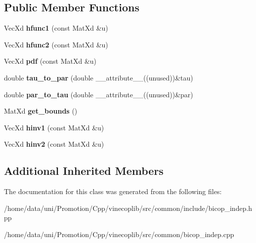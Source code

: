 \subsection*{Public Member Functions}
\begin{DoxyCompactItemize}
\item 
\hypertarget{class_indep_bicop_aced6c870ff8aeacf8332e65cbed82aed}{Vec\+Xd {\bfseries hfunc1} (const Mat\+Xd \&u)}\label{class_indep_bicop_aced6c870ff8aeacf8332e65cbed82aed}

\item 
\hypertarget{class_indep_bicop_a2d863253f1fedde7a39170a253077613}{Vec\+Xd {\bfseries hfunc2} (const Mat\+Xd \&u)}\label{class_indep_bicop_a2d863253f1fedde7a39170a253077613}

\item 
\hypertarget{class_indep_bicop_af8ff16675b5f9389186c3e4707e498b9}{Vec\+Xd {\bfseries pdf} (const Mat\+Xd \&u)}\label{class_indep_bicop_af8ff16675b5f9389186c3e4707e498b9}

\item 
\hypertarget{class_indep_bicop_af76e8eb41be92042aa227b02100ae162}{double {\bfseries tau\+\_\+to\+\_\+par} (double \+\_\+\+\_\+attribute\+\_\+\+\_\+((unused))\&tau)}\label{class_indep_bicop_af76e8eb41be92042aa227b02100ae162}

\item 
\hypertarget{class_indep_bicop_a1c6028352dfaa6a54d18b719db946d5e}{double {\bfseries par\+\_\+to\+\_\+tau} (double \+\_\+\+\_\+attribute\+\_\+\+\_\+((unused))\&par)}\label{class_indep_bicop_a1c6028352dfaa6a54d18b719db946d5e}

\item 
\hypertarget{class_indep_bicop_a2ad5826fb2b0cad3b749a29296a3c1dc}{Mat\+Xd {\bfseries get\+\_\+bounds} ()}\label{class_indep_bicop_a2ad5826fb2b0cad3b749a29296a3c1dc}

\item 
\hypertarget{class_indep_bicop_a181b4cb4b38780c988c2488be9c51210}{Vec\+Xd {\bfseries hinv1} (const Mat\+Xd \&u)}\label{class_indep_bicop_a181b4cb4b38780c988c2488be9c51210}

\item 
\hypertarget{class_indep_bicop_ad51f09200fb44dff2a704056b4730087}{Vec\+Xd {\bfseries hinv2} (const Mat\+Xd \&u)}\label{class_indep_bicop_ad51f09200fb44dff2a704056b4730087}

\end{DoxyCompactItemize}
\subsection*{Additional Inherited Members}


The documentation for this class was generated from the following files\+:\begin{DoxyCompactItemize}
\item 
/home/data/uni/\+Promotion/\+Cpp/vinecoplib/src/common/include/bicop\+\_\+indep.\+hpp\item 
/home/data/uni/\+Promotion/\+Cpp/vinecoplib/src/common/bicop\+\_\+indep.\+cpp\end{DoxyCompactItemize}
